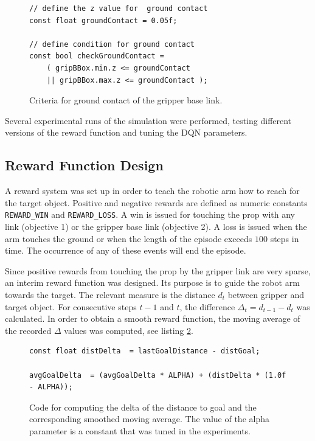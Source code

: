 \documentclass[11pt, onecolumn, oneside, reqno]{amsart}
\begin{document}
\begin{figure}[thpb]
\centering
\begin{lstlisting}
// define the z value for  ground contact
const float groundContact = 0.05f;

// define condition for ground contact
const bool checkGroundContact =
	( gripBBox.min.z <= groundContact
	|| gripBBox.max.z <= groundContact );
\end{lstlisting}
\caption{Criteria for ground contact of the gripper base link.}
\label{fig:listing_ground_contact}
\end{figure}

Several experimental runs of the simulation were performed, testing different versions of the reward function and tuning the DQN parameters.

\subsection{Reward Function Design}
\label{sec:reward-function-design}
A reward system was set up in order to teach the robotic arm how to reach for the target object. Positive and negative rewards are defined as numeric constants \texttt{REWARD\_WIN} and \texttt{REWARD\_LOSS}. A win is issued for touching the prop with any link (objective 1) or the gripper base link (objective 2). A loss is issued when the arm touches the ground or when the length of the episode exceeds $100$ steps in time. The occurrence of any of these events will end the episode.

Since positive rewards from touching the prop by the gripper link are very sparse, an interim reward function was designed. Its purpose is to guide the robot arm towards the target. The relevant measure is the distance $d_t$ between gripper and target object. For consecutive steps $t-1$ and $t$, the difference $\Delta_t = d_{t-1} - d_t$ was calculated. In order to obtain a smooth reward function, the moving average of the recorded $\Delta$ values was computed, see listing \ref{fig:source_smoothed_moving_average}. 
\begin{figure}[htpb]
\centering
\begin{lstlisting}
const float distDelta  = lastGoalDistance - distGoal;

avgGoalDelta  = (avgGoalDelta * ALPHA) + (distDelta * (1.0f - ALPHA));
\end{lstlisting}
\caption{Code for computing the delta of the distance to goal and the corresponding smoothed moving average. The value of the alpha parameter is a constant that was tuned in the experiments.}
\label{fig:source_smoothed_moving_average}
\end{figure}
\end{document}
